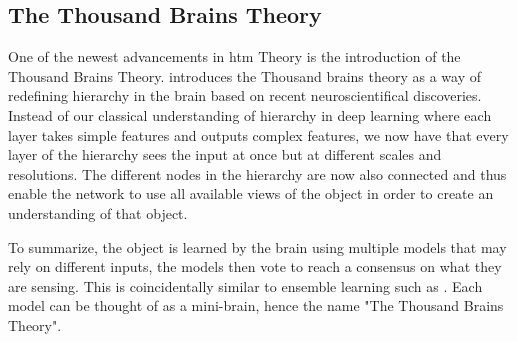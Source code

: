 \subsection{The Thousand Brains Theory}
One of the newest advancements in \gls*{htm} Theory is the introduction of the Thousand Brains Theory. \textcite{thousandbrains} introduces the Thousand brains theory as a way of redefining hierarchy in the brain based on recent neuroscientifical discoveries. Instead of our classical understanding of hierarchy in deep learning where each layer takes simple features and outputs complex features, we now have that every layer of the hierarchy sees the input at once but at different scales and resolutions. The different nodes in the hierarchy are now also connected and thus enable the network to use all available views of the object in order to create an understanding of that object. \par
To summarize, the object is learned by the brain using multiple models that may rely on different inputs, the models then vote to reach a consensus on what they are sensing. This is coincidentally similar to ensemble learning such as \textcite{divergentNets}. Each model can be thought of as a mini-brain, hence the name "The Thousand Brains Theory".
